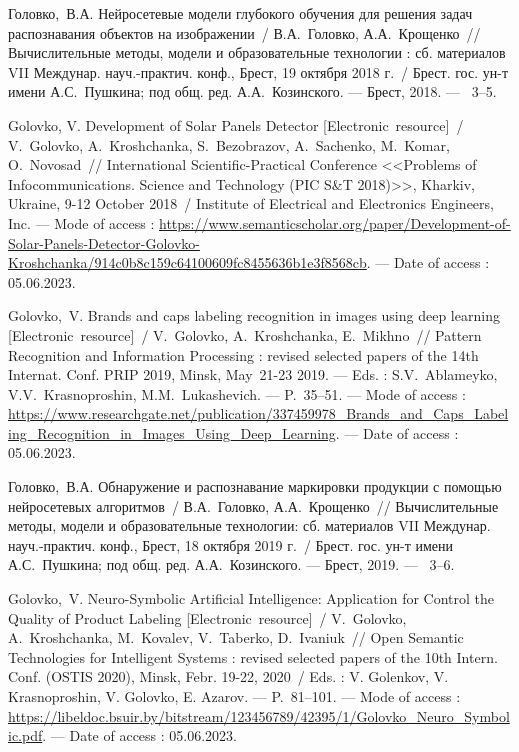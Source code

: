 Головко,~В.А. Нейросетевые модели глубокого обучения для решения задач распознавания объектов на изображении~/ В.А.~Головко, А.А.~Крощенко~//
\newblock Вычислительные методы, модели и образовательные технологии : сб. материалов VII Междунар. науч.-практич. конф., Брест, 19 октября 2018 г.~/
\newblock Брест. гос. ун-т имени А.С.~Пушкина; под общ. ред. А.А.~Козинского. ---
\newblock Брест, 2018. ---
~3--5. 

Golovko, V. Development of Solar Panels Detector [Electronic~resource]~/ V.~Golovko, A.~Kroshchanka, S.~Bezobrazov, A.~Sachenko, M.~Komar, O.~Novosad~//
 International Scientific-Practical Conference <<Problems of Infocommunications. Science and Technology (PIC S\&T 2018)>>, Kharkiv, Ukraine, 9-12 October 2018~/
\newblock Institute of Electrical and Electronics Engineers, Inc. ---
\newblock Mode of access : \url{https://www.semanticscholar.org/paper/Development-of-Solar-Panels-Detector-Golovko-Kroshchanka/914c0b8c159c64100609fc8455636b1e3f8568cb}. ---
\newblock Date of access : 05.06.2023.

Golovko,~V. Brands and caps labeling recognition in images using deep learning [Electronic~resource]~/ V.~Golovko, A.~Kroshchanka, E.~Mikhno~//
\newblock Pattern Recognition and Information Processing : revised selected papers of the 14th Internat. Conf. PRIP 2019, Minsk, May~21-23 2019. ---
\newblock Eds. : S.V.~Ablameyko, V.V.~Krasnoproshin, M.M.~Lukashevich. ---
\newblock P.~35--51. ---
\newblock Mode of access : \url{https://www.researchgate.net/publication/337459978_Brands_and_Caps_Labeling_Recognition_in_Images_Using_Deep_Learning}. ---
\newblock Date of access : 05.06.2023.

Головко,~В.А. Обнаружение и распознавание маркировки продукции с помощью нейросетевых алгоритмов~/ В.А.~Головко, А.А.~Крощенко~//
\newblock Вычислительные методы, модели и образовательные технологии: сб. материалов VII Междунар. науч.-практич. конф., Брест, 18 октября 2019 г.~/
\newblock Брест. гос. ун-т имени А.С.~Пушкина; под общ. ред. А.А.~Козинского. ---
\newblock Брест, 2019. ---
~3--6. 

Golovko,~V. Neuro-Symbolic Artificial Intelligence: Application for Control the Quality of Product Labeling [Electronic~resource]~/ V.~Golovko, A.~Kroshchanka, M.~Kovalev, V.~Taberko, D.~Ivaniuk~// 
\newblock Open Semantic Technologies for Intelligent Systems : revised selected papers of the 10th Intern. Conf. (OSTIS 2020), Minsk, Febr. 19-22, 2020~/
\newblock Eds. : V. Golenkov, V. Krasnoproshin, V. Golovko, E. Azarov. ---
\newblock P.~81--101. ---
\newblock Mode of access : \url{https://libeldoc.bsuir.by/bitstream/123456789/42395/1/Golovko_Neuro_Symbolic.pdf}. ---
\newblock Date of access : 05.06.2023.

